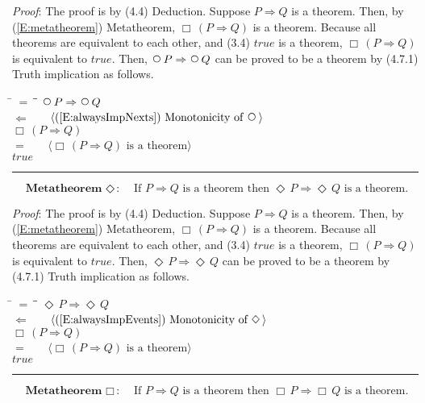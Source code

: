 \documentclass[12pt, fleqn, leqno]{article}
\newcommand{\lgap}{2pt}                             %
\newcommand{\mymathindent}{24pt}                    %
\newcommand{\impl}{\ensuremath{\Rightarrow}}        %
\newcommand{\foll}{\ensuremath{\Leftarrow}}         %
\newcommand{\Next}{\;\,\text{\raisebox{3.5pt}{\circle{6}}}}
\newcommand{\Event}{\Diamond\,}
\newcommand{\Always}{\Box\,}
\newcommand{\myqed}{\rule[-.23ex]{1.2ex}{2.0ex}}
\newcommand{\myqedtab}{\hspace{384pt}}              %
\newcommand{\Gll} {\langle}                         %
\newcommand{\Ggg} {\rangle}                         %
\newcommand{\Hint}[1]     {\ \ \ $\Gll              \mbox{#1} \Ggg$ }   %
\begin{document}
\emph{Proof}: The proof is by (4.4) Deduction.
Suppose $P\impl Q$ is a theorem.
Then, by (\ref{E:metatheorem}) Metatheorem, $\Always (P\impl Q)$ is a theorem.
Because all theorems are equivalent to each other, and (3.4) $true$ is a theorem, $\Always (P\impl Q)$ is equivalent to $true$.
Then, $\Next P\impl\Next Q$ can be proved to be a theorem by (4.7.1) Truth implication as follows.
\begin{tabbing}
\hspace{\mymathindent} \= $= \;$ \= \myqedtab \= \kill
\> \> $\Next P\impl\Next Q$\\[\lgap]
\> $\foll$ \> \Hint{(\ref{E:alwaysImpNexts}) Monotonicity of $\Next$} \\[\lgap]
\> \> $\Always (P\impl Q)$\\[\lgap]
\> $=$ \> \Hint{$\Always (P\impl Q)$ is a theorem} \\[\lgap]
\> \> $true$ \quad \myqed
\end{tabbing}
\begin{equation}\label{E:metaEvent}
\textbf{Metatheorem $\Event$:}\quad \text{If } P\impl Q \text{ is a theorem then } \Event P\impl\Event Q \text{ is a theorem.}
\end{equation}

\emph{Proof}: The proof is by (4.4) Deduction.
Suppose $P\impl Q$ is a theorem.
Then, by (\ref{E:metatheorem}) Metatheorem, $\Always (P\impl Q)$ is a theorem.
Because all theorems are equivalent to each other, and (3.4) $true$ is a theorem, $\Always (P\impl Q)$ is equivalent to $true$.
Then, $\Event P\impl\Event Q$ can be proved to be a theorem by (4.7.1) Truth implication as follows.
\begin{tabbing}
\hspace{\mymathindent} \= $= \;$ \= \myqedtab \= \kill
\> \> $\Event P\impl\Event Q$\\[\lgap]
\> $\foll$ \> \Hint{(\ref{E:alwaysImpEvents}) Monotonicity of $\Event$} \\[\lgap]
\> \> $\Always (P\impl Q)$\\[\lgap]
\> $=$ \> \Hint{$\Always (P\impl Q)$ is a theorem} \\[\lgap]
\> \> $true$ \quad \myqed
\end{tabbing}
\begin{equation}\label{E:metaAlways}
\textbf{Metatheorem $\Always$:}\quad \text{If } P\impl Q \text{ is a theorem then } \Always P\impl\Always Q \text{ is a theorem.}
\end{equation}
\end{document}
